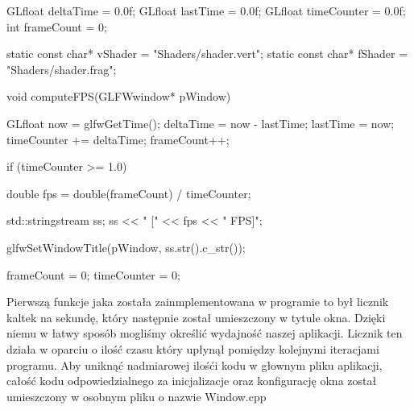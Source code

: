 \documentclass[a4paper,12pt]{article}
\numberwithin{equation}{section}
\begin{document}
\begin{cppcode}

GLfloat deltaTime = 0.0f;
GLfloat lastTime = 0.0f;
GLfloat timeCounter = 0.0f;
int frameCount = 0;

static const char* vShader = "Shaders/shader.vert";
static const char* fShader = "Shaders/shader.frag";

void computeFPS(GLFWwindow* pWindow)
{
	GLfloat now = glfwGetTime();
	deltaTime = now - lastTime;
	lastTime = now;
	timeCounter += deltaTime;
	frameCount++;

	if (timeCounter >= 1.0) {
		double fps = double(frameCount) / timeCounter;

		std::stringstream ss;
		ss << " [" << fps << " FPS]";

		glfwSetWindowTitle(pWindow, ss.str().c_str());

		frameCount = 0;
		timeCounter = 0;
	}
}
\end{cppcode}
Pierwszą funkcje jaka została zainmplementowana w programie to był licznik kaltek na sekundę, który następnie został umieszczony w tytule okna. Dzięki niemu w łatwy sposób mogliśmy określić wydajność naszej aplikacji. Licznik ten działa w oparciu o ilość czasu który upłynął pomiędzy kolejnymi iteracjami programu.
\newline
\indent Aby uniknąć nadmiarowej ilośći kodu w głownym pliku aplikacji, całość kodu odpowiedzialnego za inicjalizacje oraz konfigurację okna został umieszczony w osobnym pliku o nazwie Window.cpp
\end{document}
